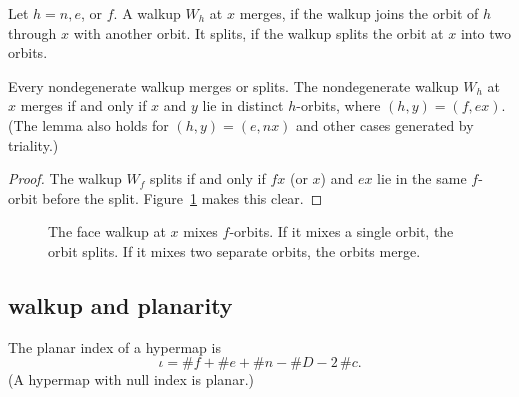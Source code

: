 \begin{definition} Let $h=n,e$, or $f$.
A walkup $W_h$ at $x$ merges,
if the walkup joins the orbit of $h$ through $x$ with another orbit.  
It splits, if the walkup splits the orbit at $x$ into two orbits.
\end{definition}

\begin{lemma} 
Every nondegenerate walkup merges or splits. The nondegenerate walkup $W_h$ at $x$ merges if and only if $x$ and $y$  lie in distinct $h$-orbits, where $(h,y)=(f,e x)$.   (The lemma also holds for $(h,y)=(e,n x)$ and other cases generated
by triality.)
\end{lemma}

\begin{proof} The walkup $W_f$ splits if and only if $f x$ 
(or $x$)
and $e x$ lie in the same $f$-orbit before the split. 
Figure~\ref{fig:split} makes this clear.
\end{proof}


\begin{figure}[htb]
  \centering
  \caption{The face walkup at $x$ mixes $f$-orbits.   If it mixes a single orbit,   the orbit splits. If it mixes   two separate    orbits, the orbits merge. }
  \label{fig:split}
\end{figure}


\subsection{walkup and planarity}

\begin{definition} The planar index of a hypermap is
$$\iota = \# f + \# e + \# n - \# D - 2\,\# c.$$
(A hypermap with null index is planar.)
\end{definition}

